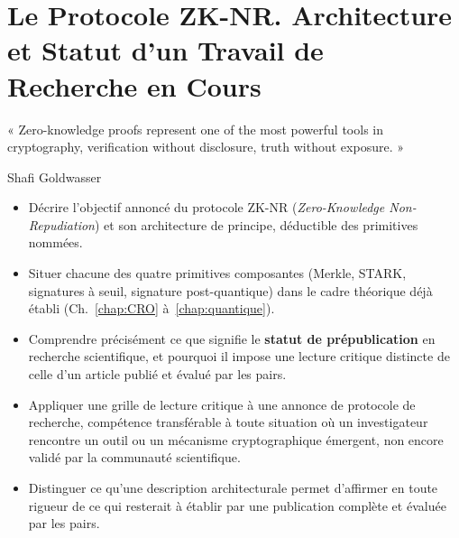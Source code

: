 
\chapter{Le Protocole ZK-NR. Architecture et Statut d'un Travail
de Recherche en Cours}
\label{chap:ZKNR}

\epigraph{%
    « Zero-knowledge proofs represent one of the most powerful tools in
    cryptography, verification without disclosure, truth without
    exposure. »%
}{Shafi Goldwasser}


\begin{boxobjectifs}
\begin{itemize}
    \item Décrire l'objectif annoncé du protocole ZK-NR
          (\textit{Zero-Knowledge Non-Repudiation}) et son architecture
          de principe, déductible des primitives nommées.
    \item Situer chacune des quatre primitives composantes
          (Merkle, STARK, signatures à seuil, signature post-quantique)
          dans le cadre théorique déjà établi (Ch.~\ref{chap:CRO}
          à~\ref{chap:quantique}).
    \item Comprendre précisément ce que signifie le \textbf{statut
          de prépublication} en recherche scientifique, et pourquoi
          il impose une lecture critique distincte de celle d'un
          article publié et évalué par les pairs.
    \item Appliquer une grille de lecture critique à une annonce de
          protocole de recherche, compétence transférable à
          toute situation où un investigateur rencontre un outil
          ou un mécanisme cryptographique émergent, non encore
          validé par la communauté scientifique.
    \item Distinguer ce qu'une description architecturale permet
          d'affirmer en toute rigueur de ce qui resterait à établir
          par une publication complète et évaluée par les pairs.
\end{itemize}
\end{boxobjectifs}

